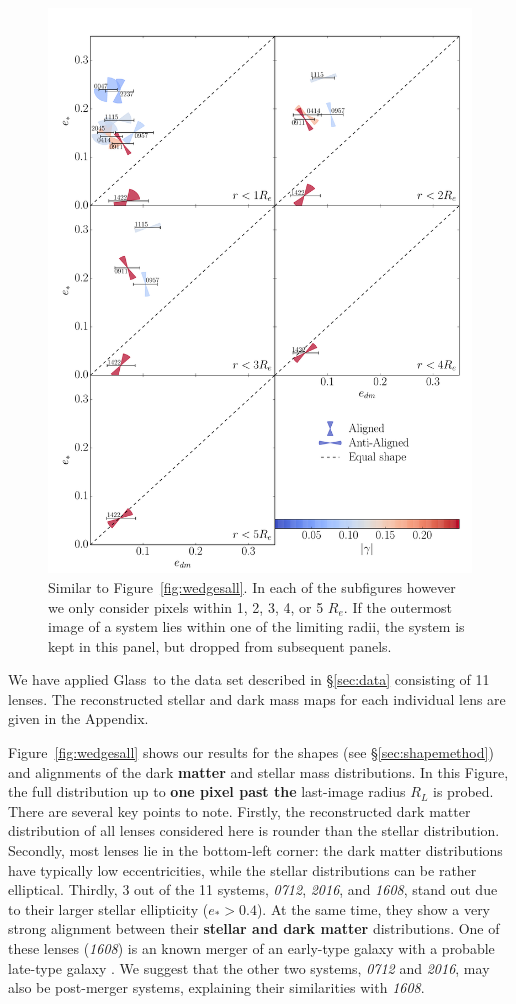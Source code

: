 \documentclass[useAMS,usenatbib]{mn2e}
\def\Glass{{\sc Glass}}
\newcommand{\cb}[1]{{\color{red} \textbf{#1}}}
\begin{document}
\begin{figure}
  \centering
  \includegraphics[width=.8\linewidth]{Figures/wedges.pdf}
  \caption[width=\linewidth]{Similar to Figure~\ref{fig:wedgesall}. In each of the subfigures however we only consider pixels within 1, 2, 3, 4, or 5 $R_e$. If the outermost image of a system lies within one of the limiting radii, the system is kept in this panel, but dropped from subsequent panels.}
  \label{fig:wedgesradii}
\end{figure}

We have applied \Glass\ to the data set described in \S\ref{sec:data} consisting of 11 lenses. The reconstructed stellar and dark mass maps for each individual lens are given in the Appendix.

Figure~\ref{fig:wedgesall} shows our results for the shapes (see \S\ref{sec:shapemethod}) and alignments of the dark \cb{matter} and stellar mass distributions. In this Figure, the full distribution up to \cb{one pixel past the} last-image radius $R_{L}$ is probed. There are several key points to note. Firstly, the reconstructed dark matter distribution of all lenses considered here is rounder than the stellar distribution. Secondly, most lenses lie in the bottom-left corner: the dark matter distributions have typically low eccentricities, while the stellar distributions can be rather elliptical. Thirdly, 3 out of the 11 systems, {\it0712}, {\it2016}, and {\it1608}, stand out due to their larger stellar ellipticity ($e_* > 0.4$). At the same time, they show a very strong alignment between their \cb{stellar and dark matter} distributions. One of these lenses ({\it1608}) is an known merger of an early-type galaxy with a probable late-type galaxy \citep{2003ApJ...584..100S}. We suggest that the other two systems, {\it0712} and {\it2016}, may also be post-merger systems, explaining their similarities with {\it1608}.
\end{document}
